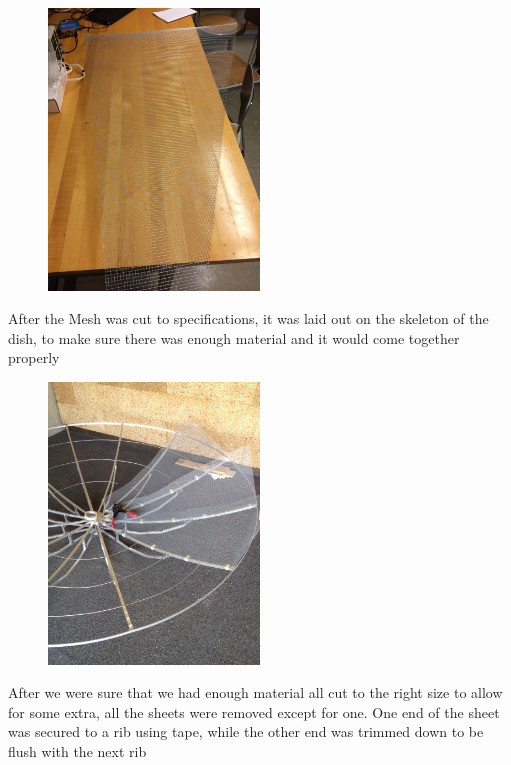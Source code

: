 \documentclass[11pt]{article} %
\begin{document}
\begin{figure}
  \centering
  \caption{   }
  \includegraphics[width=0.50\textwidth]{dish/11.jpeg}
\end{figure}


After the Mesh was cut to specifications, it was laid out on the skeleton of the dish, to make sure there was enough material and it would come together properly

\begin{figure}
  \centering
  \caption{   }
  \includegraphics[width=0.50\textwidth]{dish/12.jpeg}
\end{figure}

After we were sure that we had enough material all cut to the right size to allow for some extra, all the sheets were removed except for one. One end of the sheet was secured to a rib using tape, while the other end was trimmed down to be flush with the next rib
\end{document}
